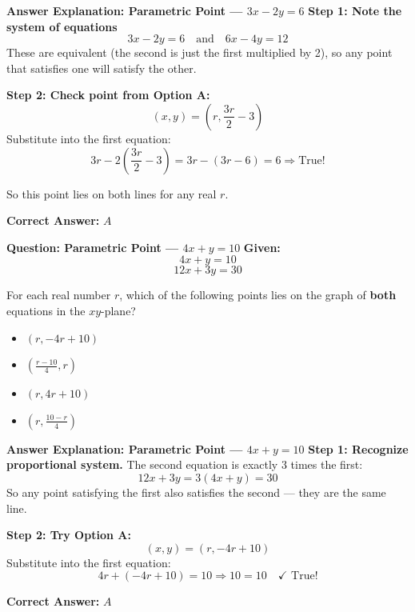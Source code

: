 \documentclass{beamer}
\begin{document}
\begin{frame}{\textbf{Answer Explanation: Parametric Point — \( 3x - 2y = 6 \)}}
\textbf{Step 1: Note the system of equations}
\[
3x - 2y = 6 \quad \text{and} \quad 6x - 4y = 12
\]
These are equivalent (the second is just the first multiplied by 2), so any point that satisfies one will satisfy the other.

\textbf{Step 2: Check point from Option A:}  
\[
(x, y) = \left( r, \frac{3r}{2} - 3 \right)
\]
Substitute into the first equation:
\[
3r - 2\left( \frac{3r}{2} - 3 \right) = 3r - (3r - 6) = 6
\Rightarrow \text{True!}
\]

So this point lies on both lines for any real \( r \).

\textbf{Correct Answer:} \( \boxed{A} \)
\end{frame}

\begin{frame}{\textbf{Question: Parametric Point — \( 4x + y = 10 \)}}
\textbf{Given:}
\[
4x + y = 10 
\]
\[12x + 3y = 30\]

For each real number \( r \), which of the following points lies on the graph of \textbf{both} equations in the \( xy \)-plane?

\begin{itemize}
    \item[\textbf{A.}] \( \left( r, -4r + 10 \right) \)
    \item[\textbf{B.}] \( \left( \frac{r - 10}{4}, r \right) \)
    \item[\textbf{C.}] \( \left( r, 4r + 10 \right) \)
    \item[\textbf{D.}] \( \left( r, \frac{10 - r}{4} \right) \)
\end{itemize}
\end{frame}


\begin{frame}{\textbf{Answer Explanation: Parametric Point — \( 4x + y = 10 \)}}
\textbf{Step 1: Recognize proportional system.}  
The second equation is exactly 3 times the first:
\[
12x + 3y = 3(4x + y) = 30
\]
So any point satisfying the first also satisfies the second — they are the same line.

\textbf{Step 2: Try Option A:}  
\[
(x, y) = \left( r, -4r + 10 \right)
\]
Substitute into the first equation:
\[
4r + (-4r + 10) = 10 \Rightarrow 10 = 10 \quad \text{✓ True!}
\]

\textbf{Correct Answer:} \( \boxed{A} \)
\end{frame}
\end{document}
